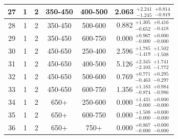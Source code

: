 \begin{table}[htbp]
\begin{centering}
\begin{tabular}{|c|c|c|c|c||c|}
\hline
27 &               1 &               2 &         350-450 &         400-500 & 2.063 $^{+2.241}_{-1.245}$ $^{+0.814}_{-0.819}$ \\ 
\hline
28 &               1 &               2 &         350-450 &         500-600 & 0.882 $^{+1.305}_{-0.652}$ $^{+0.416}_{-0.418}$ \\ 
\hline
29 &               1 &               2 &         350-450 &         600-750 & 0.000 $^{+0.967}_{-0.000}$ $^{+0.000}_{-0.000}$ \\ 
\hline
30 &               1 &               2 &         450-650 &         250-400 & 2.596 $^{+1.785}_{-1.419}$ $^{+1.502}_{-1.508}$ \\ 
\hline
31 &               1 &               2 &         450-650 &         400-500 & 5.126 $^{+2.345}_{-2.103}$ $^{+1.741}_{-1.772}$ \\ 
\hline
32 &               1 &               2 &         450-650 &         500-600 & 0.769 $^{+0.771}_{-0.463}$ $^{+0.295}_{-0.297}$ \\ 
\hline
33 &               1 &               2 &         450-650 &         600-750 & 1.356 $^{+1.183}_{-0.874}$ $^{+0.984}_{-0.986}$ \\ 
\hline
34 &               1 &               2 &            650+ &         250-600 & 0.000 $^{+1.431}_{-0.000}$ $^{+0.000}_{-0.000}$ \\ 
\hline
35 &               1 &               2 &            650+ &         600-750 & 0.000 $^{+1.508}_{-0.000}$ $^{+0.000}_{-0.000}$ \\ 
\hline
36 &               1 &               2 &            650+ &            750+ & 0.000 $^{+0.867}_{-0.000}$ $^{+0.000}_{-0.000}$ \\ 
\hline
\end{tabular}
\par\end{centering}
\end{table}

